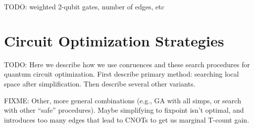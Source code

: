 TODO: weighted 2-qubit gates, number of edges, etc


\section{Circuit Optimization Strategies}

TODO: Here we describe how we use conruences and these search procedures for quantum circuit optimization. First describe primary method: searching local space after simplification. Then describe several other variants.

FIXME: Other, more general combinations (e.g., GA with all simps, or search with other ``safe'' procedures). Maybe simplifying to fixpoint isn't optimal, and introduces too many edges that lead to CNOTs to get us marginal T-count gain.


